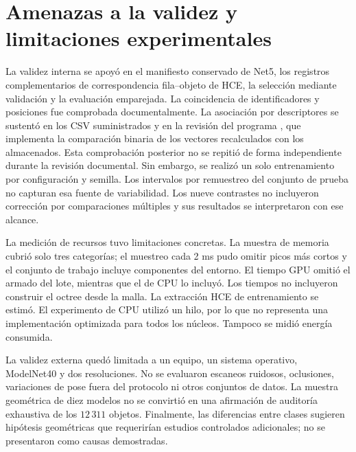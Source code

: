 \section{Amenazas a la validez y limitaciones experimentales}
\label{sec:limitaciones-experimentales}
La validez interna se apoyó en el manifiesto conservado de Net5, los registros complementarios de correspondencia fila--objeto de HCE, la selección mediante validación y la evaluación emparejada. La coincidencia de identificadores y posiciones fue comprobada documentalmente. La asociación por descriptores se sustentó en los CSV suministrados
y en la revisión del programa
\protect{}, que implementa la
comparación binaria de los vectores recalculados con los almacenados.
Esta comprobación posterior no se repitió de forma independiente
durante la revisión documental. Sin embargo, se realizó un solo entrenamiento por configuración y semilla. Los intervalos por remuestreo del conjunto de prueba no capturan esa fuente de variabilidad. Los nueve contrastes no incluyeron corrección por comparaciones múltiples y sus resultados se interpretaron con ese alcance.

La medición de recursos tuvo limitaciones concretas. La muestra de memoria cubrió solo tres categorías; el muestreo cada 2 ms pudo omitir picos más cortos y el conjunto de trabajo incluye componentes del entorno. El tiempo GPU omitió el armado del lote, mientras que el de CPU lo incluyó. Los tiempos no incluyeron construir el octree desde la malla. La extracción HCE de entrenamiento se estimó. El experimento de CPU utilizó un hilo, por lo que no representa una implementación optimizada para todos los núcleos. Tampoco se midió energía consumida.

La validez externa quedó limitada a un equipo, un sistema operativo, ModelNet40 y dos resoluciones. No se evaluaron escaneos ruidosos, oclusiones, variaciones de pose fuera del protocolo ni otros conjuntos de datos. La muestra geométrica de diez modelos no se convirtió en una afirmación de auditoría exhaustiva de los $12\,311$ objetos. Finalmente, las diferencias entre clases sugieren hipótesis geométricas que requerirían estudios controlados adicionales; no se presentaron como causas demostradas.
